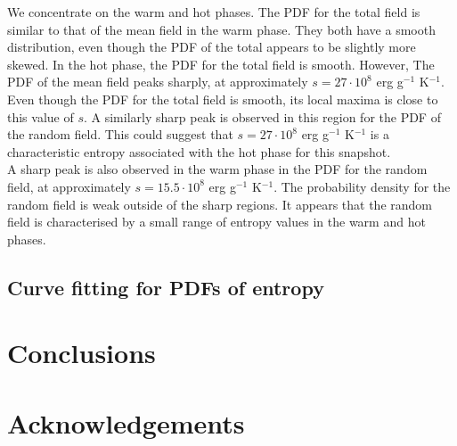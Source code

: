 \documentclass[useAMS,usenatbib]{mn2e}
\begin{document}
We concentrate on the warm and hot phases. The PDF for the total field is similar to that of the mean field in the warm phase. They both have a smooth distribution, even though the PDF of the total appears to be slightly more skewed. In the hot phase, the PDF for the total field is smooth. However, The PDF of the mean field peaks sharply, at approximately $s=27\cdot10^8$ erg g$^{-1}$ K$^{-1}$. Even though the PDF for the total field is smooth, its local maxima is close to this value of $s$. A similarly sharp peak is observed in this region for the PDF of the random field. This could suggest that $s=27\cdot10^8$ erg g$^{-1}$ K$^{-1}$ is a characteristic entropy associated with the hot phase for this snapshot. \\
A sharp peak is also observed in the warm phase in the PDF for the random field, at approximately $s=15.5\cdot10^8$ erg g$^{-1}$ K$^{-1}$. The probability density for the random field is weak outside of the sharp regions. It appears that the random field is characterised by a small range of entropy values in the warm and hot phases. 
\subsection{Curve fitting for PDFs of entropy}

 
\section{Conclusions}

\newpage
\section*{Acknowledgements}

\end{document}
